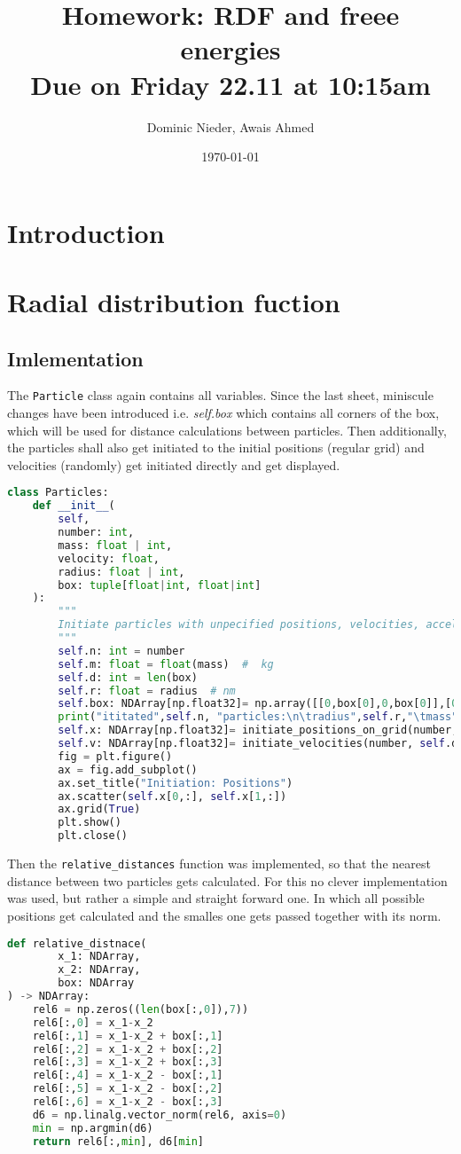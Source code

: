 \documentclass{article}[a4paper]
\title{
    \vspace{2in}
    \textmd{\textbf{Homework: RDF and freee energies}}\\
    \normalsize\vspace{0.1in}\small{Due on Friday 22.11 at 10:15am}\\
    \vspace{0.1in}
    \vspace{3in}
}
\author{Dominic Nieder, Awais Ahmed}
\date{\today}
\begin{document}
\section{Introduction}


\section{Radial distribution fuction}
\subsection{Imlementation}

The \texttt{Particle} class again contains all variables. 
Since the last sheet, miniscule changes have been introduced i.e. \textit{self.box} which contains all corners of the box, which will be used for distance calculations between particles. 
Then additionally, the particles shall also get initiated to the initial positions (regular grid) and velocities (randomly) get initiated directly and get displayed.
\begin{lstlisting}[language=Python]
class Particles:
    def __init__(
        self,
        number: int,
        mass: float | int,
        velocity: float,
        radius: float | int,
        box: tuple[float|int, float|int]
    ):
        """
        Initiate particles with unpecified positions, velocities, accelerations.
        """
        self.n: int = number
        self.m: float = float(mass)  #  kg
        self.d: int = len(box)
        self.r: float = radius  # nm
        self.box: NDArray[np.float32]= np.array([[0,box[0],0,box[0]],[0,0,box[1],box[1]]])  # nm
        print("ititated",self.n, "particles:\n\tradius",self.r,"\tmass",self.m,"\tdimensions",self.d)
        self.x: NDArray[np.float32]= initiate_positions_on_grid(number,box) 
        self.v: NDArray[np.float32]= initiate_velocities(number, self.d, velocity)
        fig = plt.figure()
        ax = fig.add_subplot()
        ax.set_title("Initiation: Positions")
        ax.scatter(self.x[0,:], self.x[1,:])
        ax.grid(True)
        plt.show()      
        plt.close()
\end{lstlisting}

Then the \texttt{relative\_distances} function was implemented, so that the nearest distance between two particles gets calculated. 
For this no clever implementation was used, but rather a simple and straight forward one. 
In which all possible positions get calculated and the smalles one gets passed together with its norm.
\begin{lstlisting}[language=Python]
def relative_distnace(
        x_1: NDArray,
        x_2: NDArray,
        box: NDArray
) -> NDArray:
    rel6 = np.zeros((len(box[:,0]),7))
    rel6[:,0] = x_1-x_2 
    rel6[:,1] = x_1-x_2 + box[:,1]
    rel6[:,2] = x_1-x_2 + box[:,2]
    rel6[:,3] = x_1-x_2 + box[:,3]
    rel6[:,4] = x_1-x_2 - box[:,1]
    rel6[:,5] = x_1-x_2 - box[:,2]
    rel6[:,6] = x_1-x_2 - box[:,3]
    d6 = np.linalg.vector_norm(rel6, axis=0)
    min = np.argmin(d6)
    return rel6[:,min], d6[min]
\end{lstlisting}
\end{document}
